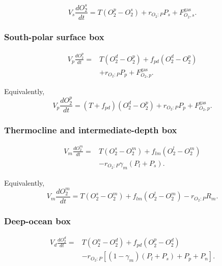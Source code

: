 \documentclass[11pt]{article}
\begin{document}
\begin{equation}
V_s\frac{dO_2^s}{dt}
=
T\left(O_2^p-O_2^s\right)
+
r_{O_2:P}P_s
+
F^{\mathrm{gas}}_{O_2,s}.
\label{eq:six_o2_s}
\end{equation}

\subsubsection{South-polar surface box}

\begin{equation}
\begin{split}
V_p\frac{dO_2^p}{dt}
={}&
T\left(O_2^d-O_2^p\right)
+
f_{pd}\left(O_2^d-O_2^p\right)
\\
&+
r_{O_2:P}P_p
+
F^{\mathrm{gas}}_{O_2,p}.
\end{split}
\label{eq:six_o2_p}
\end{equation}

Equivalently,
\begin{equation}
V_p\frac{dO_2^p}{dt}
=
\left(T+f_{pd}\right)
\left(O_2^d-O_2^p\right)
+
r_{O_2:P}P_p
+
F^{\mathrm{gas}}_{O_2,p}.
\label{eq:six_o2_p_compact}
\end{equation}

\subsubsection{Thermocline and intermediate-depth box}

\begin{equation}
\begin{split}
V_m\frac{dO_2^m}{dt}
={}&
T\left(O_2^s-O_2^m\right)
+
f_{lm}\left(O_2^l-O_2^m\right)
\\
&-
r_{O_2:P}
\gamma_m\left(P_l+P_s\right).
\end{split}
\label{eq:six_o2_m}
\end{equation}

Equivalently,
\begin{equation}
V_m\frac{dO_2^m}{dt}
=
T\left(O_2^s-O_2^m\right)
+
f_{lm}\left(O_2^l-O_2^m\right)
-
r_{O_2:P}R_m.
\label{eq:six_o2_m_compact}
\end{equation}

\subsubsection{Deep-ocean box}

\begin{equation}
\begin{split}
V_d\frac{dO_2^d}{dt}
={}&
T\left(O_2^n-O_2^d\right)
+
f_{pd}\left(O_2^p-O_2^d\right)
\\
&-
r_{O_2:P}
\left[
\left(1-\gamma_m\right)
\left(P_l+P_s\right)
+
P_p+P_n
\right].
\end{split}
\label{eq:six_o2_d}
\end{equation}
\end{document}
